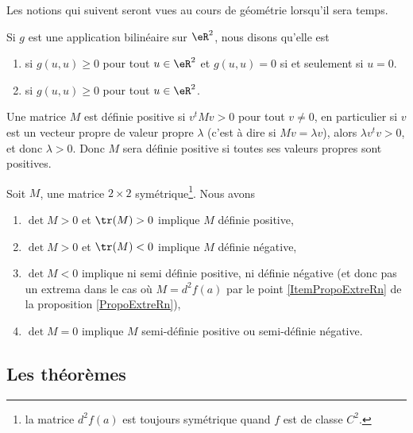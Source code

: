 Les notions qui suivent seront vues au cours de géométrie lorsqu'il sera temps. 

Si $g$ est une application bilinéaire sur $\eR^2$, nous disons qu'elle est
\begin{enumerate}

\item
{} si $g(u,u)\geq 0$ pour tout $u\in\eR^2$ et $g(u,u)=0$ si et seulement si $u=0$.

\item
{} si $g(u,u)\geq 0$ pour tout $u\in\eR^2$. 

\end{enumerate}

Une matrice $M$ est définie positive si $v^tMv>0$ pour tout $v\neq 0$, en particulier si $v$ est un vecteur propre de valeur propre $\lambda$ (c'est à dire si $Mv=\lambda v$), alors $\lambda v^tv>0$, et donc $\lambda>0$. Donc $M$ sera définie positive si toutes ses valeurs propres sont positives.

\begin{proposition}
    Soit $M$, une matrice $2\times 2$ symétrique\footnote{la matrice $d^2f(a)$ est toujours symétrique quand $f$ est de classe $C^2$.}. Nous avons
    \begin{enumerate}
        \item
        $\det M>0$ et $\tr(M)>0$ implique $M$ définie positive,
        \item
        $\det M>0$ et $\tr(M)<0$ implique $M$ définie négative,
        \item
        $\det M<0$ implique ni semi définie positive, ni définie négative (et donc pas un extrema dans le cas où $M=d^2f(a)$ par le point \ref{ItemPropoExtreRn} de la proposition \ref{PropoExtreRn}),
        \item
        $\det M=0$ implique $M$ semi-définie positive ou semi-définie négative.
    \end{enumerate}
\end{proposition}
 

                    \subsection{Les théorèmes}



